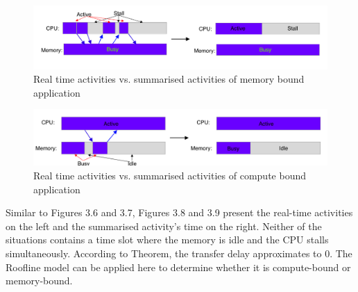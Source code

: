 \begin{figure} [h] %
	\centering   %
	\includegraphics[width=16cm]{pictures/fig3.8}
	\caption{Real time activities vs. summarised activities of memory bound application}
	\label{fig3.8}  %
\end{figure}
\begin{figure} [h] %
	\centering   %
	\includegraphics[width=16cm]{pictures/fig3.9}
	\caption{Real time activities vs. summarised activities of compute bound application}
	\label{fig3.9}  %
\end{figure}
Similar to Figures 3.6 and 3.7, Figures 3.8 and 3.9 present the real-time activities on the left and the summarised activity's time on the right. Neither of the situations contains a time slot where the memory is idle and the CPU stalls simultaneously. According to Theorem, the transfer delay approximates to $0$. The Roofline model can be applied here to determine whether it is compute-bound or memory-bound.



